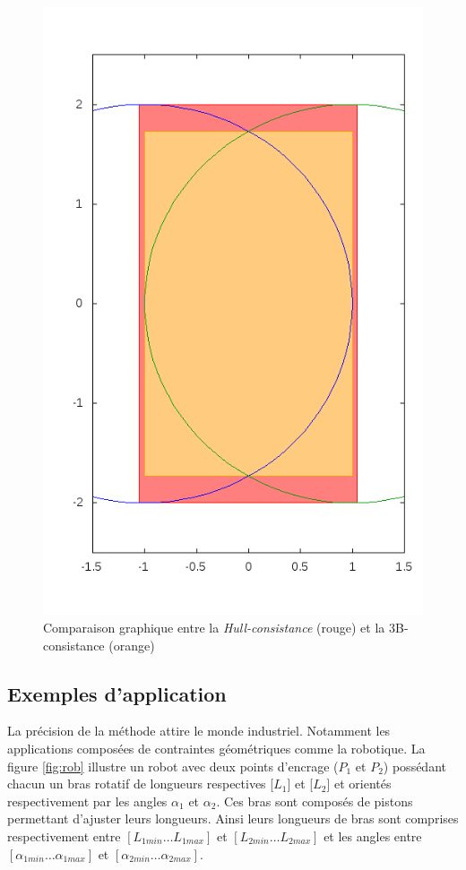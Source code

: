 \begin{figure}[ht!] %
  \center
\includegraphics[scale=0.35]{img/disk-disk2}
  \caption{Comparaison graphique entre la \emph{Hull-consistance} (rouge) et la 3B-consistance (orange)} %
 \label{fig:3Bconst} %
\end{figure} %


\subsection{Exemples d'application}

La précision de la méthode attire le monde industriel. Notamment les applications composées de contraintes géométriques comme la robotique. La figure \ref{fig:rob} illustre un robot avec deux points d'encrage ($P_1$ et $P_2$) possédant chacun un bras rotatif de longueurs respectives [$L_1$] et [$L_2$] et orientés respectivement par les angles $\alpha_1$ et $\alpha_2$. Ces bras sont composés de pistons permettant d'ajuster leurs longueurs. Ainsi leurs longueurs de bras sont comprises respectivement entre $[L_{1min} \dots L_{1max}]$ et $[L_{2min} \dots L_{2max}]$ et les angles entre $[\alpha_{1min} \dots \alpha_{1max}]$ et $[\alpha_{2min} \dots \alpha_{2max}]$.  

